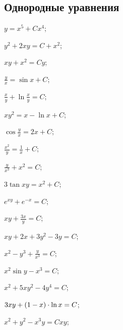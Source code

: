 \subsection*{Однородные уравнения}

	\label{sol:firstorder:homogeneous}
	\begin{enumsols}

		\item \( y = x^5 + Cx^4 \); \sfill %
		\item \( y^2 + 2xy = C + x^2 \); \sfill %
		\item \( xy + x^2 = Cy \); \sfill %
		\item \( \frac{y}{x} = \sin{x} + C \); \sfill %
		\item \( \frac{x}{y} + \ln{\frac{x}{y}} = C \); \sfill %
		\item \( xy^2 = x - \ln{x} + C \); \sfill %
		\item \( \cos{\frac{y}{x}} = 2x + C \); \sfill %
		\item \( \frac{x^2}{y} = \frac{1}{x} + C \); \sfill %
		\item \( \frac{y}{x^3} + x^2 = C \); \sfill %
		\item \( 3 \tan{xy} = x^2 + C \); \sfill %
		\item \( e^{xy} + e^{-x} = C \); \sfill %
		\item \( xy + \frac{3x}{y} = C \); \sfill %
		\item \( xy + 2x + 3y^2 - 3y = C \); \sfill %
		\item \( x^2 - y^3 + \frac{y}{x^3} = C \); \sfill %
		\item \( x^2 \sin{y} - x^3 = C \); \sfill %
		\label{sol:firstorder:homogeneous2}
		\item \( x^2 + 5xy^2 - 4y^4 = C \); \sfill %
		\item \( 3xy + \left( 1 - x \right) \cdot \ln{x} = C \); \sfill %
		\item \( x^2 + y^2 - x^3 y = Cxy \); \sfill %

\end{enumsols}
